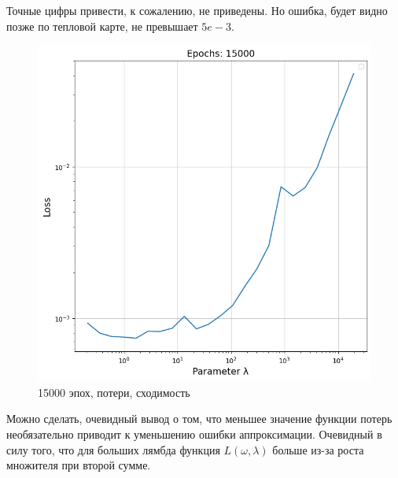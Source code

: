 Точные цифры привести, к сожалению, не приведены. Но ошибка, будет видно позже по тепловой карте, не превышает $5e-3$.

\begin{figure}[ht!]
    \centering
    \includegraphics[width=0.45\hsize]{images/6.png}
    \caption{15000 эпох, потери, сходимость}
\end{figure}

\newpage

Можно сделать, очевидный вывод о том, что меньшее значение функции потерь необязательно приводит к уменьшению ошибки аппроксимации.
Очевидный в силу того, что для больших лямбда функция $L(\omega, \lambda)$ больше из-за роста множителя при второй сумме.


